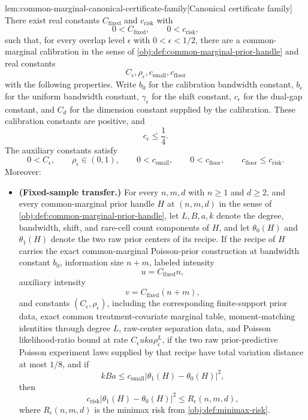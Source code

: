 \documentclass[11pt]{article}
\begin{document}
\begin{lemmav}{lem:common-marginal-canonical-certificate-family}[Canonical certificate family]
There exist real constants \(C_{\mathrm{fixed}}\) and \(c_{\mathrm{risk}}\) with
\[
0<C_{\mathrm{fixed}},
\qquad
0<c_{\mathrm{risk}},
\]
such that, for every overlap level \(\epsilon\) with \(0<\epsilon<1/2\), there are a common-marginal calibration in the sense of \cref{obj:def:common-marginal-prior-handle} and real constants
\[
C_\epsilon,\rho_\epsilon,c_{\mathrm{small}},c_{\mathrm{floor}}
\]
with the following properties.  Write \(b_0\) for the calibration bandwidth constant, \(b_\epsilon\) for the uniform bandwidth constant, \(\gamma_\epsilon\) for the shift constant, \(c_\epsilon\) for the dual-gap constant, and \(C_d\) for the dimension constant supplied by the calibration.  These calibration constants are positive, and
\[
c_\epsilon\le \frac14 .
\]
The auxiliary constants satisfy
\[
0<C_\epsilon,
\qquad
\rho_\epsilon\in(0,1),
\qquad
0<c_{\mathrm{small}},
\qquad
0<c_{\mathrm{floor}},
\qquad
c_{\mathrm{floor}}\le c_{\mathrm{risk}} .
\]
Moreover:
\begin{itemize}
\item \textbf{(Fixed-sample transfer.)}
For every \(n,m,d\) with \(n\ge1\) and \(d\ge2\), and every common-marginal prior handle \(H\) at \((n,m,d)\) in the sense of \cref{obj:def:common-marginal-prior-handle}, let \(L,B,a,k\) denote the degree, bandwidth, shift, and rare-cell count components of \(H\), and let \(\theta_0(H)\) and \(\theta_1(H)\) denote the two raw prior centers of its recipe.  If the recipe of \(H\) carries the exact common-marginal Poisson-prior construction at bandwidth constant \(b_0\), information size \(n+m\), labeled intensity
\[
u=C_{\mathrm{fixed}}n,
\]
auxiliary intensity
\[
v=C_{\mathrm{fixed}}(n+m),
\]
and constants \((C_\epsilon,\rho_\epsilon)\), including the corresponding finite-support prior data, exact common treatment-covariate marginal table, moment-matching identities through degree \(L\), raw-center separation data, and Poisson likelihood-ratio bound at rate \(C_\epsilon u k a\rho_\epsilon^L\), if the two raw prior-predictive Poisson experiment laws supplied by that recipe have total variation distance at most \(1/8\), and if
\[
kBa
\le
c_{\mathrm{small}}
\left|\theta_1(H)-\theta_0(H)\right|^2,
\]
then
\[
c_{\mathrm{risk}}
\left|\theta_1(H)-\theta_0(H)\right|^2
\le
R_\epsilon(n,m,d),
\]
where \(R_\epsilon(n,m,d)\) is the minimax risk from \cref{obj:def:minimax-risk}.


\end{itemize}
\end{lemmav}
\end{document}
